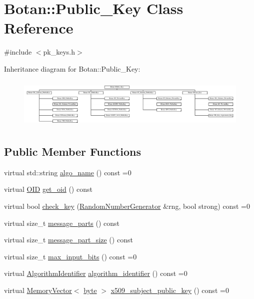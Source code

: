 \hypertarget{classBotan_1_1Public__Key}{\section{Botan\-:\-:Public\-\_\-\-Key Class Reference}
\label{classBotan_1_1Public__Key}
}


{\ttfamily \#include $<$pk\-\_\-keys.\-h$>$}

Inheritance diagram for Botan\-:\-:Public\-\_\-\-Key\-:\begin{figure}[H]
\begin{center}
\leavevmode
\includegraphics[height=2.450000cm]{classBotan_1_1Public__Key}
\end{center}
\end{figure}
\subsection*{Public Member Functions}
\begin{DoxyCompactItemize}
\item 
virtual std\-::string \hyperlink{classBotan_1_1Public__Key_aec4ee42d508712e05388eaa9200c630b}{algo\-\_\-name} () const =0
\item 
virtual \hyperlink{classBotan_1_1OID}{O\-I\-D} \hyperlink{classBotan_1_1Public__Key_a3dae6d94343323725d07fbe36d96dfa8}{get\-\_\-oid} () const 
\item 
virtual bool \hyperlink{classBotan_1_1Public__Key_a75a50182e188bf1398ac3f228c8ba58e}{check\-\_\-key} (\hyperlink{classBotan_1_1RandomNumberGenerator}{Random\-Number\-Generator} \&rng, bool strong) const =0
\item 
virtual size\-\_\-t \hyperlink{classBotan_1_1Public__Key_af43dcda103a69ebeef8e6db5ada3f984}{message\-\_\-parts} () const 
\item 
virtual size\-\_\-t \hyperlink{classBotan_1_1Public__Key_a57387f46717a829f30a5794390501834}{message\-\_\-part\-\_\-size} () const 
\item 
virtual size\-\_\-t \hyperlink{classBotan_1_1Public__Key_a8de8523fe64e3b606e7f002057dcd662}{max\-\_\-input\-\_\-bits} () const =0
\item 
virtual \hyperlink{classBotan_1_1AlgorithmIdentifier}{Algorithm\-Identifier} \hyperlink{classBotan_1_1Public__Key_a3b9a0e5c9301f9daa84cfee7e49ef660}{algorithm\-\_\-identifier} () const =0
\item 
virtual \hyperlink{classBotan_1_1MemoryVector}{Memory\-Vector}$<$ \hyperlink{namespaceBotan_a7d793989d801281df48c6b19616b8b84}{byte} $>$ \hyperlink{classBotan_1_1Public__Key_a9d71978d0891d73029eb016e2eb0da03}{x509\-\_\-subject\-\_\-public\-\_\-key} () const =0
\end{DoxyCompactItemize}
